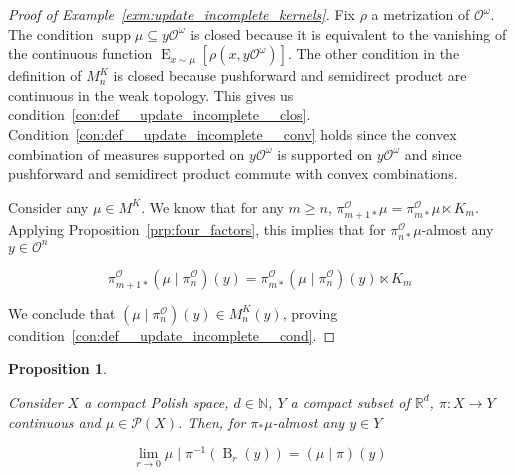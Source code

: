 \documentclass[11pt]{article}
\theoremstyle{definition}
\theoremstyle{plain}
\newtheorem{proposition}{Proposition}%
\newcommand{\Nats}{\mathbb{N}}
\newcommand{\Reals}{\mathbb{R}}
\newcommand{\B}{\operatorname{B}}
\DeclareMathOperator{\E}{E}
\newcommand{\PM}{\mathcal{P}}
\DeclareMathOperator{\Sp}{supp}
\newcommand{\Ob}{\mathcal{O}}
\newcommand{\OO}{\Ob^\omega}
\newcommand{\PO}{\pi^\Ob}
\begin{document}
\begin{proof}[Proof of Example~\ref{exm:update_incomplete_kernels}]
Fix $\rho$ a metrization of $\OO$. The condition $\Sp{\mu} \subseteq y\OO$ is closed because it is equivalent to the vanishing of the continuous function $\E_{x\sim\mu}\left[\rho\left(x,y\OO\right)\right]$. The other condition in the definition of $M^K_n$ is closed because pushforward and semidirect product are continuous in the weak topology. This gives us condition~\ref{con:def__update_incomplete__clos}. Condition~\ref{con:def__update_incomplete__conv} holds since the convex combination of measures supported on $y\OO$ is supported on $y\OO$ and since pushforward and semidirect product commute with convex combinations.

Consider any $\mu \in M^K$. We know that for any $m \geq n$, $\PO_{m+1*}\mu=\PO_{m*}\mu \ltimes K_m$. Applying Proposition~\ref{prp:four_factors}, this implies that for $\PO_{n*}\mu$-almost any $y\in\Ob^n$

\[\PO_{m+1*}\left(\mu \mid \PO_n\right)(y)=\PO_{m*}\left(\mu \mid \PO_n\right)(y) \ltimes K_m\]

We conclude that $\left(\mu \mid \PO_n\right)(y) \in M^K_n(y)$, proving condition~\ref{con:def__update_incomplete__cond}.
\end{proof}

\begin{samepage}
\begin{proposition}
\label{prp:differentiation}

Consider $X$ a compact Polish space, $d \in \Nats$, $Y$ a compact subset of $\Reals^d$, $\pi: X \rightarrow Y$ continuous and $\mu \in \PM\left(X\right)$. Then, for $\pi_*\mu$-almost any $y \in Y$

\begin{equation}
\lim_{r \rightarrow 0}{\mu \mid \pi^{-1}\left(\B_r\left(y\right)\right) = \left(\mu \mid \pi\right)\left(y\right)}
\end{equation}

\end{proposition}
\end{samepage}
\end{document}
